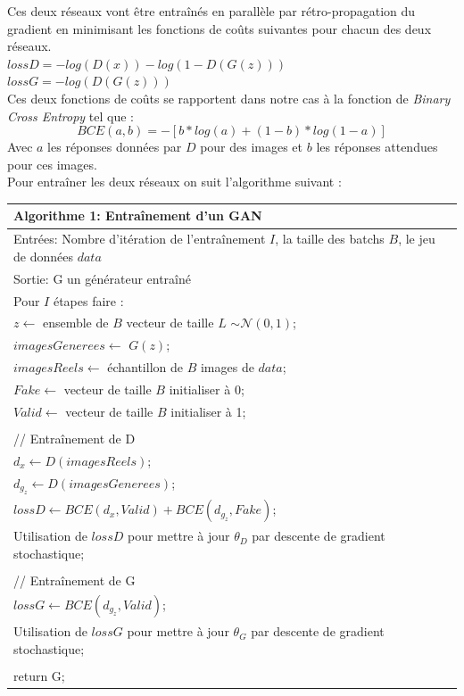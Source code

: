 \documentclass[11pt,francais]{article}
\begin{document}
Ces deux réseaux vont être entraînés en parallèle par rétro-propagation du gradient en minimisant les fonctions de coûts suivantes pour chacun des deux réseaux.\\
\(lossD = -log(D(x)) - log(1-D(G(z))) \) \\
\(lossG = -log(D(G(z))) \)  \\

Ces deux fonctions de coûts se rapportent dans notre cas à la fonction de \textit{Binary Cross Entropy} tel que : 
\[
BCE(a, b) = -[b * log(a) + (1 - b) * log(1 - a)]
\]
Avec \(a\) les réponses données par \(D\) pour des images et \(b\) les réponses attendues pour ces images.\\
\newpage
Pour entraîner les deux réseaux on suit l'algorithme suivant :
\begin{table}[h!]
  \begin{tabular}{l}
  \hline
  Algorithme 1: Entraînement d'un GAN\tabularnewline
  \hline
  Entrées: Nombre d'itération de l'entraînement  \(I\), la taille des batchs \(B\), le jeu de données \(data\)  \tabularnewline
  Sortie: G un générateur entraîné \tabularnewline
  \hline
  Pour \(I\) étapes faire :\tabularnewline 
  \hspace{1cm}\(z \leftarrow\) ensemble de \(B\) vecteur de taille \(L\) \(\sim \mathcal{N}(0,1)\);\tabularnewline
  \hspace{1cm}\(imagesGenerees \leftarrow\) \(G(z)\);\tabularnewline  
  \hspace{1cm}\(imagesReels \leftarrow\) échantillon de \(B\) images de \(data\);\tabularnewline
  \hspace{1cm}\(Fake \leftarrow\) vecteur de taille \(B\) initialiser à 0;\tabularnewline
  \hspace{1cm}\(Valid \leftarrow\) vecteur de taille \(B\) initialiser à 1;\tabularnewline
  \tabularnewline
  \hspace{1cm}// Entraînement de D\tabularnewline
  \hspace{1cm}\(d_x \leftarrow D(imagesReels)\);\tabularnewline
  \hspace{1cm}\(d_{g_z} \leftarrow D(imagesGenerees)\);\tabularnewline
  \hspace{1cm}\(lossD \leftarrow BCE(d_x,Valid) + BCE(d_{g_z},Fake)\);\tabularnewline
  \hspace{1cm}Utilisation de \(lossD\) pour mettre à jour \(\theta_D\) par descente de gradient stochastique;\tabularnewline
  \tabularnewline
  \hspace{1cm}// Entraînement de G\tabularnewline
  \hspace{1cm}\(lossG\leftarrow BCE(d_{g_z},Valid)\);\tabularnewline
  \hspace{1cm}Utilisation de \(lossG\) pour mettre à jour \(\theta_G\) par descente de gradient stochastique;\tabularnewline
  \tabularnewline
  return G;\tabularnewline
  \hline
  \end{tabular}
  \label{tab:tab1}
\end{table}
\end{document}
